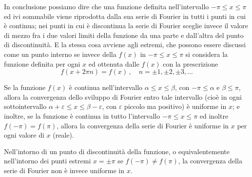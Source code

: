 \documentclass[11pt, a4paper]{book}
\numberwithin{equation}{section}
\begin{document}
In conclusione possiamo dire che una funzione definita nell'intervallo $-\pi \leq x \leq \pi$ ed ivi sommabile viene riprodotta dalla sua serie di Fourier in tutti i punti in cui è continua; nei punti in cui è discontinua la serie di Fourier sceglie invece il valore di mezzo fra i due valori limiti della funzione da una parte e dall'altra del punto di discontinuità. E la stessa cosa avviene agli estremi, che possono essere discussi come un punto interno se invece della $f(x)$ in $-\pi \leq x \leq \pi$ si considera la funzione definita per ogni $x$ ed ottenuta dalle $f(x)$ con la prescrizione
\begin{equation}
  f(x+2\pi n) = f(x)\,,\quad n=\pm1,\pm2,\pm3,\ldots \tag{9}
\end{equation}

Se la funzione $f(x)$ è continua nell'intervallo $\alpha \leq x \leq \beta$, con $-\pi \leq \alpha$ e $\beta \leq \pi$, allora la convergenza dello sviluppo di Fourier entro tale intervallo (cioè in ogni sottointervallo $\alpha+\varepsilon \leq x \leq \beta-\varepsilon$, con $\varepsilon$ piccolo ma positivo) è uniforme in $x$; e inoltre, se la funzione è continua in tutto l'intervallo $-\pi \leq x \leq \pi$ ed inoltre $f(-\pi)=f(\pi)$, allora la convergenza della serie di Fourier è uniforme in $x$ per ogni valore di $x$ (reale).

Nell'intorno di un punto di discontinuità della funzione, o equivalentemente nell'intorno dei punti estremi $x=\pm\pi$ se $f(-\pi)\neq f(\pi)$, la convergenza della serie di Fourier non è invece uniforme in $x$.
\end{document}
